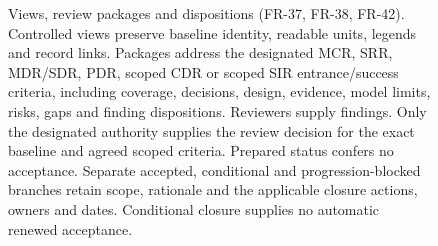 \begin{figure}[H]
\centering
{}
\caption[Views, review packages and dispositions.]{Views, review packages and dispositions (FR-37, FR-38, FR-42). Controlled views preserve baseline identity, readable units, legends and record links. Packages address the designated MCR, SRR, MDR/SDR, PDR, scoped CDR or scoped SIR entrance/success criteria, including coverage, decisions, design, evidence, model limits, risks, gaps and finding dispositions. Reviewers supply findings. Only the designated authority supplies the review decision for the exact baseline and agreed scoped criteria. Prepared status confers no acceptance. Separate accepted, conditional and progression-blocked branches retain scope, rationale and the applicable closure actions, owners and dates. Conditional closure supplies no automatic renewed acceptance.}
\label{fig:fr-flow-23}
\end{figure}
\endgroup
\clearpage
